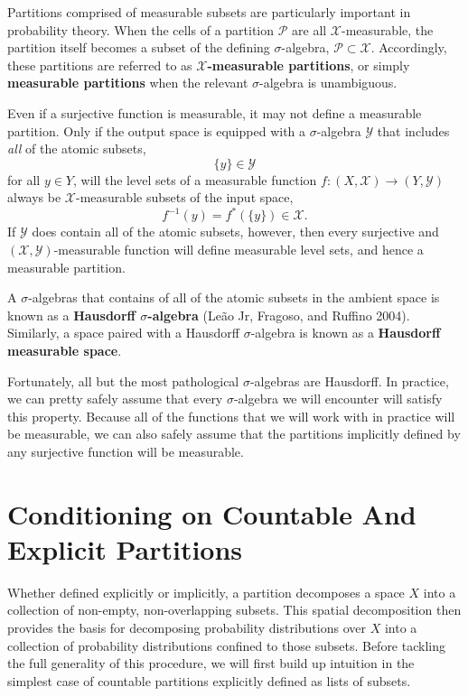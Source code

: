 \documentclass[
  letterpaper,
  DIV=11,
  numbers=noendperiod]{scrartcl}
\begin{document}
Partitions comprised of measurable subsets are particularly important in
probability theory. When the cells of a partition \(\mathcal{P}\) are
all \(\mathcal{X}\)-measurable, the partition itself becomes a subset of
the defining \(\sigma\)-algebra, \(\mathcal{P} \subset \mathcal{X}\).
Accordingly, these partitions are referred to as
\textbf{\(\mathcal{X}\)-measurable partitions}, or simply
\textbf{measurable partitions} when the relevant \(\sigma\)-algebra is
unambiguous.

Even if a surjective function is measurable, it may not define a
measurable partition. Only if the output space is equipped with a
\(\sigma\)-algebra \(\mathcal{Y}\) that includes \emph{all} of the
atomic subsets, \[
\{ y \} \in \mathcal{Y}
\] for all \(y \in Y\), will the level sets of a measurable function
\(f : (X, \mathcal{X}) \rightarrow (Y, \mathcal{Y})\) always be
\(\mathcal{X}\)-measurable subsets of the input space, \[
f^{-1}( y ) = f^{*}( \{ y \} ) \in \mathcal{X}.
\] If \(\mathcal{Y}\) does contain all of the atomic subsets, however,
then every surjective and \((\mathcal{X}, \mathcal{Y})\)-measurable
function will define measurable level sets, and hence a measurable
partition.

A \(\sigma\)-algebras that contains of all of the atomic subsets in the
ambient space is known as a \textbf{Hausdorff \(\sigma\)-algebra} (Leão
Jr, Fragoso, and Ruffino 2004). Similarly, a space paired with a
Hausdorff \(\sigma\)-algebra is known as a \textbf{Hausdorff measurable
space}.

Fortunately, all but the most pathological \(\sigma\)-algebras are
Hausdorff. In practice, we can pretty safely assume that every
\(\sigma\)-algebra we will encounter will satisfy this property. Because
all of the functions that we will work with in practice will be
measurable, we can also safely assume that the partitions implicitly
defined by any surjective function will be measurable.

\section{Conditioning on Countable And Explicit
Partitions}\label{sec:explicit-conditional}

Whether defined explicitly or implicitly, a partition decomposes a space
\(X\) into a collection of non-empty, non-overlapping subsets. This
spatial decomposition then provides the basis for decomposing
probability distributions over \(X\) into a collection of probability
distributions confined to those subsets. Before tackling the full
generality of this procedure, we will first build up intuition in the
simplest case of countable partitions explicitly defined as lists of
subsets.
\end{document}
